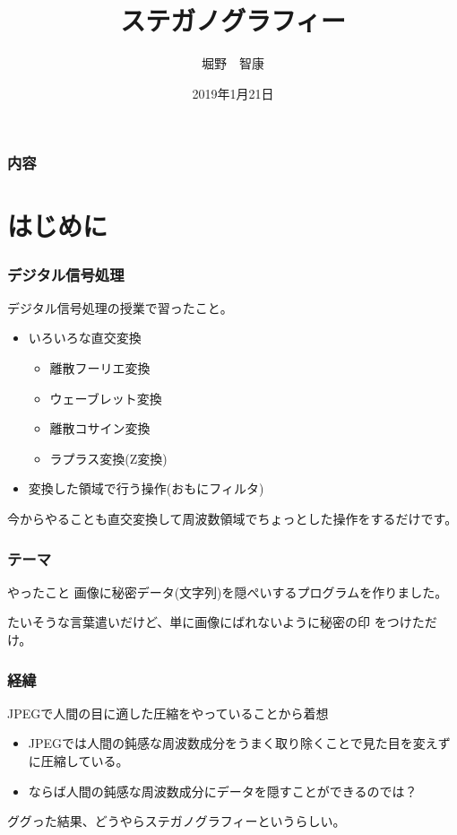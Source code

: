 \documentclass[dvipdfmx,11pt,notheorems]{beamer}
\title[steganograpy]{ステガノグラフィー}%
\author[ayame]{堀野　智康}%
\institute[KMC]{電気電子工学科3回生}%
\date{2019年1月21日}%
\theoremstyle{definition}
\begin{document}
\begin{frame}[plain]\frametitle{}
	\titlepage %
\end{frame}

\begin{frame}\frametitle{内容}
	\tableofcontents %
\end{frame}

\section{はじめに}
\begin{frame}\frametitle{デジタル信号処理}
	デジタル信号処理の授業で習ったこと。
	\begin{itemize}
		\item いろいろな直交変換
		      \begin{itemize}
			      \item 離散フーリエ変換
			      \item ウェーブレット変換
			      \item 離散コサイン変換
			      \item ラプラス変換(Z変換)
		      \end{itemize}
		\item 変換した領域で行う操作(おもにフィルタ)
	\end{itemize}

	今からやることも直交変換して周波数領域でちょっとした操作をするだけです。
\end{frame}

\begin{frame}\frametitle{テーマ}
	\begin{block}{やったこと}
		画像に秘密データ(文字列)を隠ぺいするプログラムを作りました。
	\end{block}
	たいそうな言葉遣いだけど、単に画像にばれないように秘密の印
	をつけただけ。
\end{frame}

\begin{frame}\frametitle{経緯}
	JPEGで人間の目に適した圧縮をやっていることから着想
	\begin{itemize}
		\item JPEGでは人間の鈍感な周波数成分をうまく取り除くことで見た目を変えずに圧縮している。
		\item ならば人間の鈍感な周波数成分にデータを隠すことができるのでは？
	\end{itemize}
	ググった結果、どうやらステガノグラフィーというらしい。
\end{frame}
\end{document}
